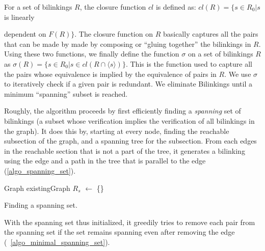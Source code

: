 \documentclass[sigplan,review]{acmart}
\begin{document}
For a set of bilinkings $R$, the closure function $cl$ is defined as:
$cl(R) = \{ s\in R_0| s$ is linearly {dependent on $F(R) \}$.
%
The closure function on $R$ basically captures all the pairs that can be made by made by composing or ``gluing together'' the bilinkings in $R$. 
%
Using these two functions, we finally define the function $\sigma$ on a set of bilinkings $R$ as
$\sigma(R) = \{s \in R_0 | s\in cl(R\cap \langle s \rangle) \}$.
This is the function used to capture all the pairs whose equivalence is implied by the equivalence of pairs in $R$.
%
We use $\sigma$ to iteratively check if a given pair is redundant.
We eliminate Bilinkings until a minimum ``spanning'' subset is reached.

Roughly, the algorithm proceeds by first efficiently finding a \textit{spanning} set of bilinkings (a subset whose verification implies the verification of all bilinkings in the graph).
It does this by, starting at every node, finding the reachable subsection of the graph, and a spanning tree for the subsection.
From each edges in the reachable section that is not a part of the tree, it generates a bilinking using the edge and a path in the tree that is parallel to the edge (\ref{algo_spanning_set}).

\begin{algorithm}[t]
\label{alg_spanning_set}
\DontPrintSemicolon
{}

Graph existingGraph\;
$R_s$ $\gets$ \{\}\;
\;

\caption{Finding a spanning set.}\label{algo_spanning_set}
\end{algorithm}

With the spanning set thus initialized, it greedily tries to remove each pair from the spanning set if the set remains spanning even after removing the edge (~\ref{algo_minimal_spanning_set}).

\begin{algorithm}
\DontPrintSemicolon
{}



\end{algorithm}}
\end{document}
